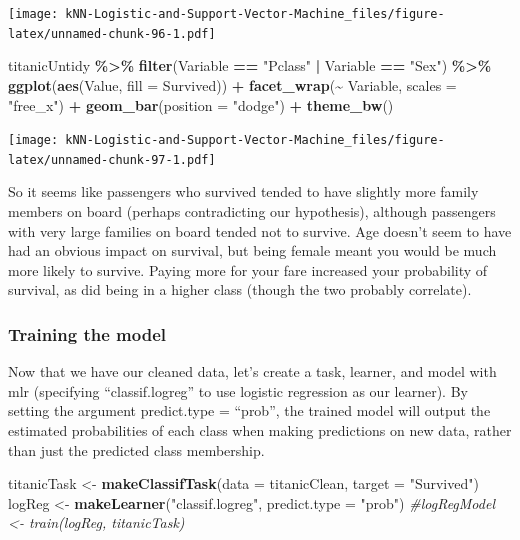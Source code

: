 \documentclass[
]{article}
\newenvironment{Shaded}{\begin{snugshade}}{\end{snugshade}}
\newcommand{\AttributeTok}[1]{\textcolor[rgb]{0.13,0.29,0.53}{#1}}
\newcommand{\CommentTok}[1]{\textcolor[rgb]{0.56,0.35,0.01}{\textit{#1}}}
\newcommand{\FunctionTok}[1]{\textcolor[rgb]{0.13,0.29,0.53}{\textbf{#1}}}
\newcommand{\NormalTok}[1]{#1}
\newcommand{\OtherTok}[1]{\textcolor[rgb]{0.56,0.35,0.01}{#1}}
\newcommand{\SpecialCharTok}[1]{\textcolor[rgb]{0.81,0.36,0.00}{\textbf{#1}}}
\newcommand{\StringTok}[1]{\textcolor[rgb]{0.31,0.60,0.02}{#1}}
\begin{document}
\texttt{[image: kNN-Logistic-and-Support-Vector-Machine\_files/figure-latex/unnamed-chunk-96-1.pdf]}

\begin{Shaded}
\begin{Highlighting}[]
\NormalTok{titanicUntidy }\SpecialCharTok{\%\textgreater{}\%}
  \FunctionTok{filter}\NormalTok{(Variable }\SpecialCharTok{==} \StringTok{"Pclass"} \SpecialCharTok{|}\NormalTok{ Variable }\SpecialCharTok{==} \StringTok{"Sex"}\NormalTok{) }\SpecialCharTok{\%\textgreater{}\%}
  \FunctionTok{ggplot}\NormalTok{(}\FunctionTok{aes}\NormalTok{(Value, }\AttributeTok{fill =}\NormalTok{ Survived)) }\SpecialCharTok{+}
  \FunctionTok{facet\_wrap}\NormalTok{(}\SpecialCharTok{\textasciitilde{}}\NormalTok{ Variable, }\AttributeTok{scales =} \StringTok{"free\_x"}\NormalTok{) }\SpecialCharTok{+}
  \FunctionTok{geom\_bar}\NormalTok{(}\AttributeTok{position =} \StringTok{"dodge"}\NormalTok{) }\SpecialCharTok{+}
\FunctionTok{theme\_bw}\NormalTok{()}
\end{Highlighting}
\end{Shaded}

\texttt{[image: kNN-Logistic-and-Support-Vector-Machine\_files/figure-latex/unnamed-chunk-97-1.pdf]}

So it seems like passengers who survived tended to have slightly more
family members on board (perhaps contradicting our hypothesis), although
passengers with very large families on board tended not to survive. Age
doesn't seem to have had an obvious impact on survival, but being female
meant you would be much more likely to survive. Paying more for your
fare increased your probability of survival, as did being in a higher
class (though the two probably correlate).

\subsubsection{Training the model}\label{training-the-model}

Now that we have our cleaned data, let's create a task, learner, and
model with mlr (specifying ``classif.logreg'' to use logistic regression
as our learner). By setting the argument predict.type = ``prob'', the
trained model will output the estimated probabilities of each class when
making predictions on new data, rather than just the predicted class
membership.

\begin{Shaded}
\begin{Highlighting}[]
\NormalTok{titanicTask }\OtherTok{\textless{}{-}} \FunctionTok{makeClassifTask}\NormalTok{(}\AttributeTok{data =}\NormalTok{ titanicClean, }\AttributeTok{target =} \StringTok{"Survived"}\NormalTok{)}
\NormalTok{logReg }\OtherTok{\textless{}{-}} \FunctionTok{makeLearner}\NormalTok{(}\StringTok{"classif.logreg"}\NormalTok{, }\AttributeTok{predict.type =} \StringTok{"prob"}\NormalTok{)}
\CommentTok{\#logRegModel \textless{}{-} train(logReg, titanicTask)}
\end{Highlighting}
\end{Shaded}
\end{document}
